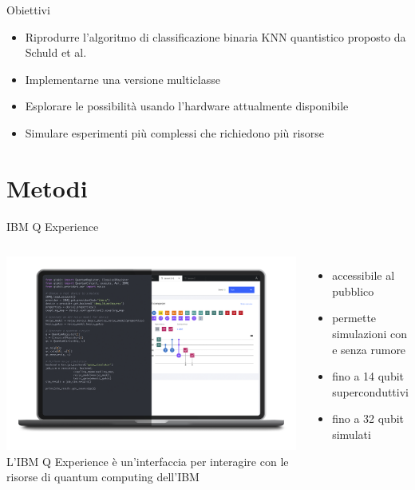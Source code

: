 \documentclass{beamer}
\begin{document}
    \begin{frame}{Obiettivi}
        \begin{itemize}
            \item Riprodurre l'algoritmo di classificazione binaria KNN quantistico proposto da Schuld et al. 
            \item Implementarne una versione multiclasse
            \item Esplorare le possibilità usando l'hardware attualmente disponibile
            \item Simulare esperimenti più complessi che richiedono più risorse
        \end{itemize}
    \end{frame}

    \section{Metodi}

    \begin{frame}{IBM Q Experience}
        \begin{columns}
            \includegraphics[width=\textwidth]{gfx/laptop_strumenti.png}
            L'IBM Q Experience è un'interfaccia per interagire con le risorse di quantum computing dell'IBM
            \begin{itemize}
                \item accessibile al pubblico
                \item permette simulazioni con e senza rumore
                \item fino a 14 qubit superconduttivi
                \item fino a 32 qubit simulati
            \end{itemize}
        \end{columns}
    \end{frame}
\end{document}
